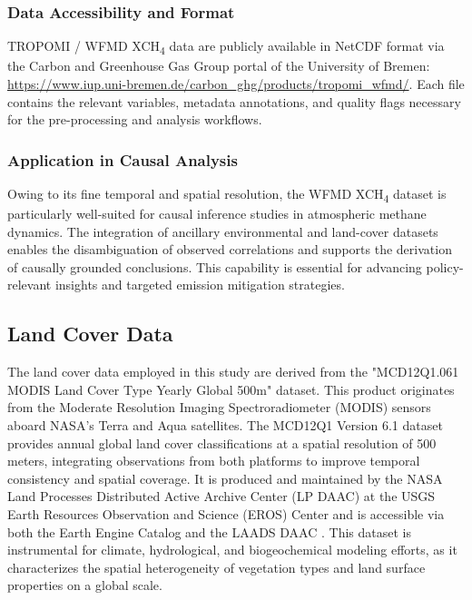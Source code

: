 \subsubsection{Data Accessibility and Format}
TROPOMI / WFMD XCH\textsubscript{4} data are publicly available in NetCDF format via the Carbon and Greenhouse Gas Group portal of the University of Bremen: \url{https://www.iup.uni-bremen.de/carbon_ghg/products/tropomi_wfmd/}. Each file contains the relevant variables, metadata annotations, and quality flags necessary for the pre-processing and analysis workflows.

\subsubsection{Application in Causal Analysis}
Owing to its fine temporal and spatial resolution, the WFMD XCH\textsubscript{4} dataset is particularly well-suited for causal inference studies in atmospheric methane dynamics. The integration of ancillary environmental and land-cover datasets enables the disambiguation of observed correlations and supports the derivation of causally grounded conclusions. This capability is essential for advancing policy-relevant insights and targeted emission mitigation strategies.


\subsection{Land Cover Data}
The land cover data employed in this study are derived from the "MCD12Q1.061 MODIS Land Cover Type Yearly Global 500m" dataset. This product originates from the Moderate Resolution Imaging Spectroradiometer (MODIS) sensors aboard NASA’s Terra and Aqua satellites. The MCD12Q1 Version 6.1 dataset provides annual global land cover classifications at a spatial resolution of 500 meters, integrating observations from both platforms to improve temporal consistency and spatial coverage. It is produced and maintained by the NASA Land Processes Distributed Active Archive Center (LP DAAC) at the USGS Earth Resources Observation and Science (EROS) Center and is accessible via both the Earth Engine Catalog \cite{modis_lc_ee} and the LAADS DAAC \cite{laads_daac}. This dataset is instrumental for climate, hydrological, and biogeochemical modeling efforts, as it characterizes the spatial heterogeneity of vegetation types and land surface properties on a global scale.

